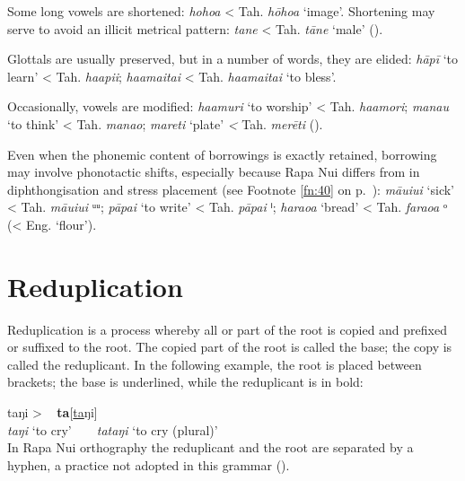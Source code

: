 Some long vowels are shortened: \textit{hoho{\ꞌ}a} {\textless} Tah. \textit{hōho{\ꞌ}a} ‘image’. Shortening may serve to avoid an illicit metrical pattern: \textit{tane} {\textless} Tah. \textit{tāne} ‘male’ ().

Glottals are usually preserved, but in a number of words, they are elided: \textit{hāpī} ‘to learn’ {\textless} Tah. \textit{ha{\ꞌ}api{\ꞌ}i}; \textit{ha{\ꞌ}amaitai} {\textless} Tah. \textit{ha{\ꞌ}amaita{\ꞌ}i} ‘to bless’. 

Occasionally, vowels are modified: \textit{ha{\ꞌ}amuri} ‘to worship’ {\textless} Tah. \textit{ha{\ꞌ}amori}; \textit{mana{\ꞌ}u} ‘to think’ {\textless} Tah. \textit{mana{\ꞌ}o}; \textit{mareti} ‘plate’ \textit{{\textless}} Tah. \textit{merēti} (). 

Even when the phonemic content of  borrowings is exactly retained, borrowing may involve phonotactic shifts, especially because Rapa Nui differs from  in diphthongisation and stress placement (see Footnote \ref{fn:40} on p.~\pageref{fn:40}): \textit{māuiui} \textstyleIPA{[ˌmaːuiˈui]} ‘sick’ {\textless} Tah. \textit{māuiui} \textstyleIPA{[ˈmaː}ᵘᵘ\textstyleIPA{i]}; \textit{pāpa{\ꞌ}i} \textstyleIPA{[ˌpaːˈpaɁi]} ‘to write’ {\textless} Tah. \textit{pāpa{\ꞌ}i} \textstyleIPA{[ˈpaːpɁa}ⁱ\textstyleIPA{]}; \textit{haraoa} \textstyleIPA{[ˌharaˈoa]} ‘bread’ {\textless} Tah. \textit{faraoa} \textstyleIPA{[faˈra(ː)}ᵒ\textstyleIPA{a]} ({\textless} Eng. ‘flour’).

\section{Reduplication}\label{sec:2.6}
Reduplication is a process whereby all or part of the root is copied and prefixed or suffixed to the root. The copied part of the root is called the base; the copy is called the reduplicant. In the following example, the root is placed between brackets; the base is underlined, while the reduplicant is in bold:

\ea
\gll  \textup{taŋi}      \textup{>} ~ \textup{\textbf{ta}[\underline{ta}ŋi]}\\
  {\textit{taŋi} ‘to cry’} ~ ~  {\textit{tataŋi} ‘to cry (plural)’}\\
\z
In Rapa Nui orthography the reduplicant and the root are separated by a hyphen, a practice not adopted in this grammar ().

